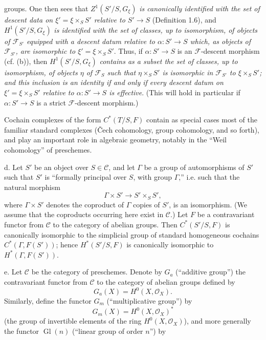 groups. One then sees that $Z^1(S'/S,G_\xi)$ \emph{is canonically identified
with the set of descent data on $\xi'=\xi\times_SS'$ relative to
$S'\longrightarrow S$} (Definition 1.6), and $H^1(S'/S,G_\xi)$ \emph{is
identified with the set of classes, up to isomorphism, of objects of
$\mathcal F_{S'}$ equipped with a descent datum relative to
$\alpha:S'\longrightarrow S$ which, as objects of $\mathcal F_{S'}$, are
isomorphic to $\xi'=\xi\times_SS'$}. Thus, if
$\alpha:S'\longrightarrow S$ is an $\mathcal F$-descent morphism (cf. (b)),
then $H^1(S'/S,G_\xi)$ \emph{contains as a subset the set of classes, up to
isomorphism, of objects $\eta$ of $\mathcal F_S$ such that
$\eta\times_SS'$ is isomorphic in $\mathcal F_{S'}$ to $\xi\times_SS'$; and
this inclusion is an identity if and only if every descent datum on
$\xi'=\xi\times_SS'$ relative to $\alpha:S'\longrightarrow S$ is effective}.
(This will hold in particular if $\alpha:S'\longrightarrow S$ is a strict
$\mathcal F$-descent morphism.)

 Cochain complexes of the form $C^*(T/S,F)$ contain as special
cases most of the familiar standard complexes (Čech cohomology, group
cohomology, and so forth), and play an important role in algebraic geometry,
notably in the “Weil cohomology” of preschemes.

\medskip\noindent
d.  Let $S'$ be an object over $S\in\mathcal C$, and let
$\Gamma$ be a group of automorphisms of $S'$ such that $S'$ is “formally
principal over $S$, with group $\Gamma$,” i.e. such that the natural morphism
\[
  \Gamma\times S'\longrightarrow S'\times_SS',
\]
where $\Gamma\times S'$ denotes the coproduct of $\Gamma$ copies of $S'$, is an
isomorphism. (We assume that the coproducts occurring here exist in
$\mathcal C$.) Let $F$ be a contravariant functor from $\mathcal C$ to the
category of abelian groups. Then $C^*(S'/S,F)$ is canonically isomorphic to the
simplicial group of standard homogeneous cochains $C^*(\Gamma,F(S'))$; hence
$H^*(S'/S,F)$ is canonically isomorphic to $H^*(\Gamma,F(S'))$.

\medskip\noindent
e.  Let $\mathcal C$ be the category of preschemes. Denote by
$G_a$ (“additive group”) the contravariant functor from $\mathcal C$ to the
category of abelian groups defined by
\[
  G_a(X)=H^0(X,\mathcal O_X).
\]
Similarly, define the functor $G_m$ (“multiplicative group”) by
\[
  G_m(X)=H^0(X,\mathcal O_X)^*
\]
(the group of invertible elements of the ring $H^0(X,\mathcal O_X)$), and more
generally the functor $\operatorname{Gl}(n)$ (“linear group of order $n$”) by

